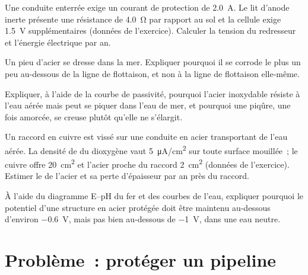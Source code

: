 \begin{exercise}[$\star\star$]\label{exo:b2:corrosion:8}
Une conduite enterrée exige un courant de protection de \qty{2.0}{A}. Le lit d'anode
inerte présente une résistance de \qty{4.0}{\ohm} par rapport au sol et la cellule exige
\qty{1.5}{V} supplémentaires (données de l'exercice). Calculer la tension du redresseur et
l'énergie électrique par an.
\end{exercise}

\begin{exercise}[$\star\star$]\label{exo:b2:corrosion:9}
Un pieu d'acier se dresse dans la mer. Expliquer pourquoi il se corrode le plus un peu au-dessous de
la ligne de flottaison, et non à la ligne de flottaison elle-même.
\end{exercise}

\begin{exercise}[$\star\star\star$]\label{exo:b2:corrosion:10}
Expliquer, à l'aide de la courbe de passivité, pourquoi l'acier inoxydable résiste à l'eau aérée mais
peut se piquer dans l'eau de mer, et pourquoi une piqûre, une fois amorcée, se creuse plutôt
qu'elle ne s'élargit.
\end{exercise}

\begin{exercise}[$\star\star\star$]\label{exo:b2:corrosion:11}
Un raccord en cuivre est vissé sur une conduite en acier transportant de l'eau aérée. La densité
de  du dioxygène vaut \qty{5}{\micro A/cm^2} sur toute surface mouillée~; le
cuivre offre \qty{20}{cm^2} et l'acier proche du raccord \qty{2}{cm^2}
(données de l'exercice). Estimer le  de l'acier et sa perte
d'épaisseur par an près du raccord.
\end{exercise}

\begin{exercise}[$\star\star\star$]\label{exo:b2:corrosion:12}
À l'aide du diagramme E--pH du fer et des courbes de l'eau, expliquer pourquoi le
potentiel d'une structure en acier protégée doit être maintenu au-dessous d'environ
\qty{-0.6}{V}, mais pas bien au-dessous de \qty{-1}{V}, dans une eau neutre.
\end{exercise}

\section{Problème~: protéger un pipeline}

